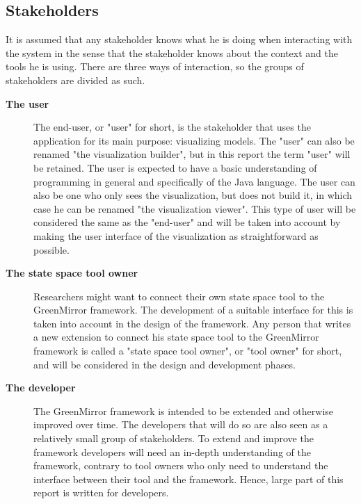 \subsection{Stakeholders}\label{sec:intro;sub:stakeh}
It is assumed that any stakeholder knows what he is doing when interacting with the system in the sense that the stakeholder knows about the context and the tools he is using. There are three ways of interaction, so the groups of stakeholders are divided as such.
\begin{description}
\item[\textbf{The user}] The end-user, or "user" for short, is the stakeholder that uses the application for its main purpose: visualizing models. The "user" can also be renamed "the visualization builder", but in this report the term "user" will be retained. The user is expected to have a basic understanding of programming in general and specifically of the Java language. The user can also be one who only sees the visualization, but does not build it, in which case he can be renamed "the visualization viewer". This type of user will be considered the same as the "end-user" and will be taken into account by making the user interface of the visualization as straightforward as possible.
\item[\textbf{The state space tool owner}] Researchers might want to connect their own state space tool to the GreenMirror framework. The development of a suitable interface for this is taken into account in the design of the framework. Any person that writes a new extension to connect his state space tool to the GreenMirror framework is called a "state space tool owner", or "tool owner" for short, and will be considered in the design and development phases.
\item[\textbf{The developer}] The GreenMirror framework is intended to be extended and otherwise improved over time. The developers that will do so are also seen as a relatively small group of stakeholders. To extend and improve the framework developers will need an in-depth understanding of the framework, contrary to tool owners who only need to understand the interface between their tool and the framework. Hence, large part of this report is written for developers.
\end{description}
